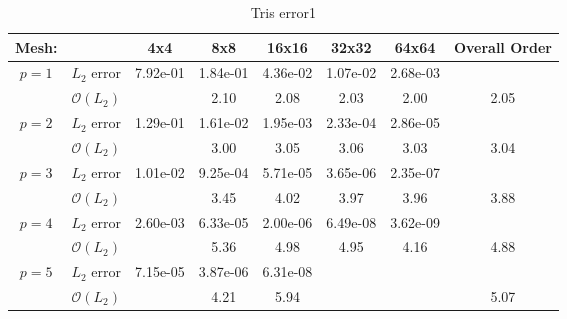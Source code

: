 \begin{table}[h]
\centering
\begin{tabular}{ c c c c c c c c} 
  
 Mesh: &   & 4x4 & 8x8 & 16x16 & 32x32 & 64x64 & Overall Order \\ 
 \hline 
 \multirow{2}{*}{$p = 1$} & $L_2$ error & 7.92e-01 & 1.84e-01 & 4.36e-02 & 1.07e-02 & 2.68e-03 &   \\ 
  
   & $\mathcal{O}(L_2)$ &   & 2.10 & 2.08 & 2.03 & 2.00 & 2.05 \\ 
 \hline 
 \multirow{2}{*}{$p = 2$} & $L_2$ error & 1.29e-01 & 1.61e-02 & 1.95e-03 & 2.33e-04 & 2.86e-05 &   \\ 
  
   & $\mathcal{O}(L_2)$ &   & 3.00 & 3.05 & 3.06 & 3.03 & 3.04 \\ 
 \hline 
 \multirow{2}{*}{$p = 3$} & $L_2$ error & 1.01e-02 & 9.25e-04 & 5.71e-05 & 3.65e-06 & 2.35e-07 &   \\ 
  
   & $\mathcal{O}(L_2)$ &   & 3.45 & 4.02 & 3.97 & 3.96 & 3.88 \\ 
 \hline 
 \multirow{2}{*}{$p = 4$} & $L_2$ error & 2.60e-03 & 6.33e-05 & 2.00e-06 & 6.49e-08 & 3.62e-09 &   \\ 
  
   & $\mathcal{O}(L_2)$ &   & 5.36 & 4.98 & 4.95 & 4.16 & 4.88 \\ 
 \hline 
 \multirow{2}{*}{$p = 5$} & $L_2$ error & 7.15e-05 & 3.87e-06 & 6.31e-08 &   &   &   \\ 
  
   & $\mathcal{O}(L_2)$ &   & 4.21 & 5.94 &   &   & 5.07 \\ 
 \hline 
 \end{tabular}
\caption{Tris error1} 
 \end{table}
